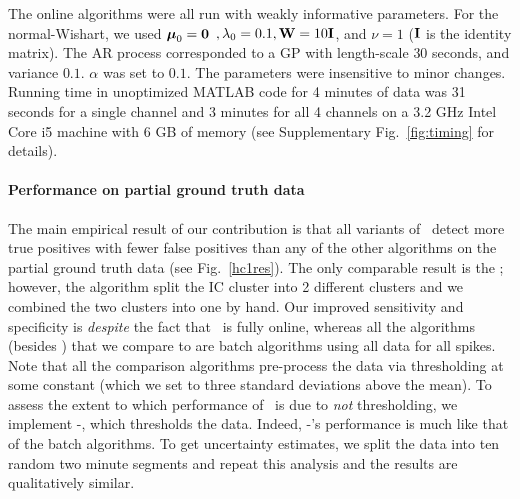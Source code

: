 

The online algorithms were all run with weakly informative parameters. For the normal-Wishart, we used  $\boldsymbol{\mu}_0=\boldsymbol{0}$ $,\lambda_0=0.1,\mathbf{W}=10\mathbf{I}$, and $\nu=1$ ($\mathbf{I}$ is the identity matrix).  
The AR process corresponded to a GP with length-scale $30$ seconds, and variance $0.1$.
$\alpha$ was set to $0.1$. The parameters were insensitive to minor changes.  Running time in unoptimized MATLAB code for 4 minutes of data was 31 seconds for a single channel and 3 minutes for all 4 channels on a 3.2 GHz Intel Core i5 machine with 6 GB of memory (see Supplementary Fig.\ \ref{fig:timing} for details).

\vspace{-.1in}
\paragraph{Performance on partial ground truth data}



The main empirical result of our contribution is that all variants of \smug\ detect more true positives with fewer false positives than any of the other algorithms on the partial ground truth data (see Fig.\ \ref{hc1res}).  The only comparable result is the ; however, the  algorithm split the IC cluster into 2 different clusters and we combined the two clusters into one by hand.  Our improved sensitivity and specificity is \emph{despite} 
the fact that \smug\ is fully online, whereas all the algorithms (besides ) that we compare to are batch algorithms using all data for all spikes.   Note that all the comparison algorithms pre-process the data via thresholding at some constant (which we set to three standard deviations above the mean).  To assess the extent to which performance of \smug\ is due to \emph{not} thresholding, we implement -\smug, which thresholds the data.  Indeed, -\smug's performance is much like that of the batch algorithms.  To get uncertainty estimates, we split the data into ten random two minute segments and repeat this analysis and the results are qualitatively similar. %


